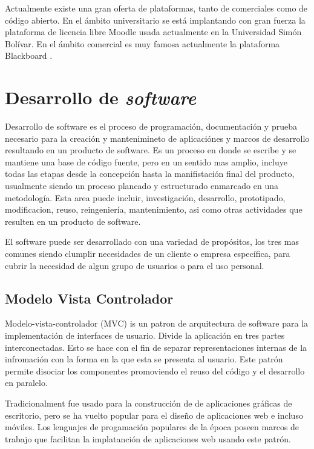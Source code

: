 Actualmente existe una gran oferta de plataformas, tanto de comerciales como de código abierto. En el ámbito universitario se está implantando con gran fuerza la plataforma de licencia libre Moodle usada actualmente en la Universidad Simón Bolívar. En el ámbito comercial es muy famosa actualmente la plataforma Blackboard .



\section{Desarrollo de \emph{software}}

Desarrollo de software es el proceso de programación, documentación y prueba necesario para la creación y mantenimineto de aplicaciónes y marcos de desarrollo resultando en un producto de software. Es un proceso en donde se escribe y se mantiene una base de código fuente, pero en un sentido mas amplio, incluye todas las etapas desde la concepción hasta la manifistación final del producto, usualmente siendo un proceso planeado y estructurado enmarcado en una metodología. Esta area puede incluir, investigación, desarrollo, prototipado, modificacion, reuso, reingeniería, mantenimiento, asi como otras actividades que resulten en un producto de software.

El software puede ser desarrollado con una variedad de propósitos, los tres mas comunes siendo clumplir necesidades de un cliente o empresa específica, para cubrir la necesidad de algun grupo de usuarios o para el uso personal.

\subsection{Modelo Vista Controlador}

Modelo-vista-controlador (MVC) is un patron de arquitectura de software para la implementación de interfaces de usuario. Divide la aplicación en tres partes interconectadas. Esto se hace con el fin de separar representaciones internas de la infromación con la forma en la que esta se presenta al usuario. Este patrón permite disociar los componentes promoviendo el reuso del código y el desarrollo en paralelo.

Tradicionalment fue usado para la construcción de de aplicaciones gráficas de escritorio, pero se ha vuelto popular para el diseño de aplicaciones web e incluso móviles. Los lenguajes de progamación populares de la época poseen marcos de trabajo que facilitan la implatanción de aplicaciones web usando este patrón.

